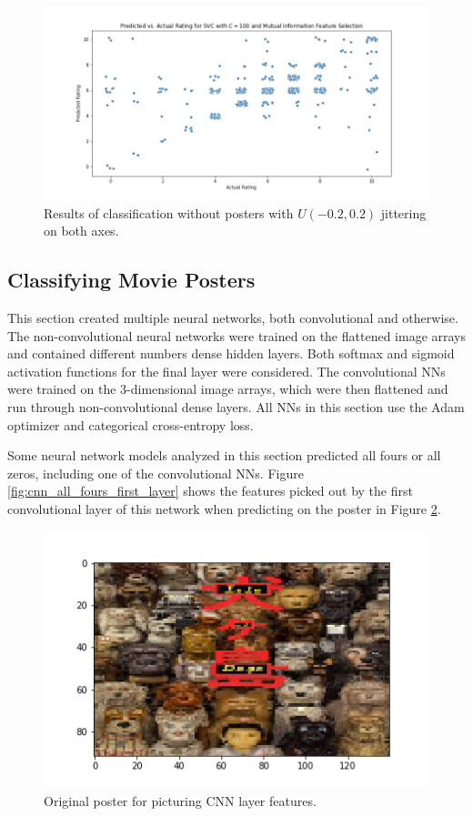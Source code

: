 \documentclass[12pt, oneside]{article}   	%
\begin{document}
\begin{figure}%
\includegraphics[width=\textwidth]{no_poster_test_results}
\caption{\label{fig:no_poster_test_results}Results of classification without posters with $U(-0.2, 0.2)$ jittering on both axes.}
\end{figure}

\subsection{Classifying Movie Posters}

This section created multiple neural networks, both convolutional and otherwise. The non-convolutional neural networks were trained on the flattened image arrays and contained different numbers dense hidden layers. Both softmax and sigmoid activation functions for the final layer were considered. The convolutional NNs were trained on the 3-dimensional image arrays, which were then flattened and run through non-convolutional dense layers. All NNs in this section use the Adam optimizer and categorical cross-entropy loss.

Some neural network models analyzed in this section predicted all fours or all zeros, including one of the convolutional NNs. Figure \ref{fig:cnn_all_fours_first_layer} shows the features picked out by the first convolutional layer of this network when predicting on the poster in Figure \ref{fig:isle_of_dogs_poster}.

\begin{figure}%
\includegraphics[width=\textwidth]{isle_of_dogs_poster}
\caption{\label{fig:isle_of_dogs_poster}Original poster for picturing CNN layer features.}
\end{figure}
\end{document}
